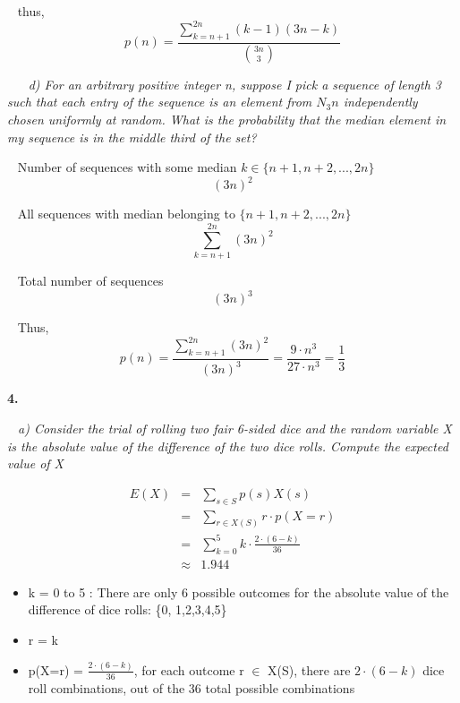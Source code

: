 \documentclass[12pt, letterpaper]{article}
\begin{document}
\-\ \newline
\textnormal{thus,}
\[ p(n) = \frac{ \sum_{k=n+1}^{2n} (k - 1)(3n - k) }{ {3n \choose 3 } } \]


\-\ \newline
\-\ \it{ d) For an arbitrary positive integer n, suppose I pick a sequence of length 3 such that each entry
of the sequence is an element from \(N_3n\) independently chosen uniformly at random. What is
the probability that the median element in my sequence is in the middle third of the set? }

\-\ \newline
\textnormal{ Number of sequences with some median \(k \in \{n + 1, n + 2, ..., 2n\}\) }
\[ (3n)^{2} \]

\-\ \newline
\textnormal{ All sequences with median belonging to \(\{n + 1, n + 2, ..., 2n\}\) }
\[ {\sum_{k=n+1}^{2n} (3n)^{2} } \]

\-\ \newline
\textnormal{ Total number of sequences }
\[ {(3n)^{3}} \]

\-\ \newline
\textnormal{ Thus, }
\[ p(n) = \frac{ \sum_{k=n+1}^{2n} (3n)^{2} }{ (3n)^3 } = \frac{9\cdot n^{3}}{27 \cdot n^{3}} = \frac{1}{3}\]



\newpage
\bf{ 4. }

\-\ \it{ a) Consider the trial of rolling two fair 6-sided dice and the random variable X is the absolute value
of the difference of the two dice rolls. Compute the expected value of X  }

\begin{eqnarray}
E(X) &=& \sum_{s \in S}^{} p(s)X(s) \\
&=& \sum_{r \in X(S)}^{} r\cdot p(X=r) \\
&=& \sum_{k=0}^{5} k\cdot \frac{2\cdot(6-k)}{36} \\
&\approx& 1.944
\end{eqnarray}

\begin{itemize}
    \item k = 0 to 5 : There are only 6 possible outcomes for the absolute value of the difference of dice rolls: \{0, 1,2,3,4,5\}
    \item r = k
    \item p(X=r) = \( \frac{2\cdot(6-k)}{36} \), for each outcome r \(\in\) X(S), there are \(2\cdot (6-k)\) dice roll combinations, out of the 36 total possible combinations
\end{itemize} 
\end{document}
